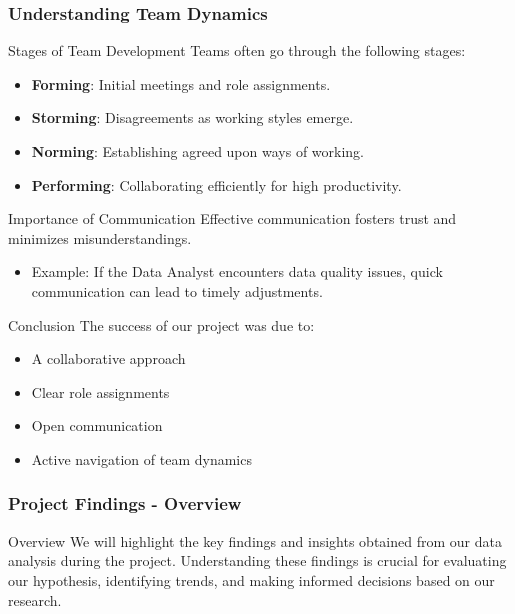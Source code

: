 \documentclass[aspectratio=169]{beamer}
\begin{document}
\begin{frame}[fragile]
    \frametitle{Understanding Team Dynamics}
    \begin{block}{Stages of Team Development}
        Teams often go through the following stages:
        \begin{itemize}
            \item \textbf{Forming}: Initial meetings and role assignments.
            \item \textbf{Storming}: Disagreements as working styles emerge.
            \item \textbf{Norming}: Establishing agreed upon ways of working.
            \item \textbf{Performing}: Collaborating efficiently for high productivity.
        \end{itemize}
    \end{block}
    
    \begin{block}{Importance of Communication}
        Effective communication fosters trust and minimizes misunderstandings.
        \begin{itemize}
            \item Example: If the Data Analyst encounters data quality issues, quick communication can lead to timely adjustments.
        \end{itemize}
    \end{block}
    
    \begin{block}{Conclusion}
        The success of our project was due to:
        \begin{itemize}
            \item A collaborative approach
            \item Clear role assignments
            \item Open communication
            \item Active navigation of team dynamics
        \end{itemize}
    \end{block}
\end{frame}

\begin{frame}[fragile]
    \frametitle{Project Findings - Overview}
    \begin{block}{Overview}
        We will highlight the key findings and insights obtained from our data analysis during the project. 
        Understanding these findings is crucial for evaluating our hypothesis, identifying trends, and making informed decisions based on our research.
    \end{block}
\end{frame}
\end{document}
